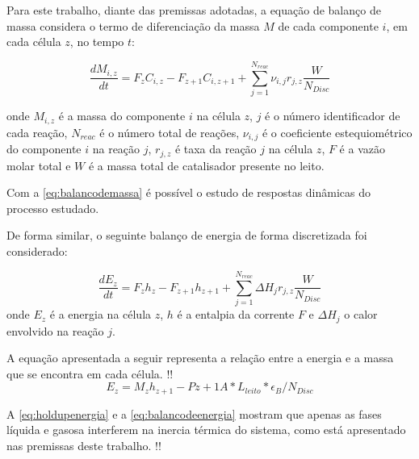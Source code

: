 Para este trabalho, diante das premissas adotadas, a equação de balanço de massa
considera o termo de diferenciação da massa $M$ de cada componente $i$, em cada
célula $z$, no tempo $t$: 

\begin{equation}
\dfrac{dM_{i,z}}{dt} = F_zC_{i,z} - F_{z+1}C_{i,z+1} +
\displaystyle\sum_{j=1}^{N_{reac}} \nu_{i,j}r_{j,z} \dfrac{W}{N_{Disc}}
\label{eq:balancodemassa}
\end{equation}

onde $M_{i,z}$ é a massa do componente $i$ na célula $z$, $j$ é o número
identificador de cada reação, $N_{reac}$ é o número total de reações,
$\nu_{i,j}$ é o coeficiente estequiométrico do componente $i$ na reação $j$,
$r_{j,z}$ é taxa da reação $j$ na célula $z$, $F$ é a vazão molar total e $W$ é
a massa total de catalisador presente no leito.

Com a \autoref{eq:balancodemassa} é possível o estudo de respostas dinâmicas do
processo estudado.


De forma similar, o seguinte balanço de energia de forma
discretizada foi considerado:

\begin{equation}
\dfrac{dE_{z}}{dt} = F_zh_{z} - F_{z+1}h_{z+1} +
\displaystyle\sum_{j=1}^{N_{reac}} \Delta H_{j}r_{j,z} \dfrac{W}{N_{Disc}}
\label{eq:balancodeenergia}
\end{equation}
onde $E_{z}$ é a energia na célula $z$, $h$ é a entalpia da corrente $F$ e
$\Delta H_{j}$ o calor envolvido na reação $j$.

A equação apresentada a seguir representa a relação entre a energia e a massa
que se encontra em cada célula.
!! 
\begin{equation}
E_{z} = M_{z}h_{z+1} - P{z+1}A*L_{leito}*\epsilon_{B}/N_{Disc}
\label{eq:holdupenergia}
\end{equation}

A \autoref{eq:holdupenergia} e a \autoref{eq:balancodeenergia} mostram que
apenas as fases líquida e gasosa interferem na inercia térmica do sistema,
como está apresentado nas premissas deste trabalho. !!

